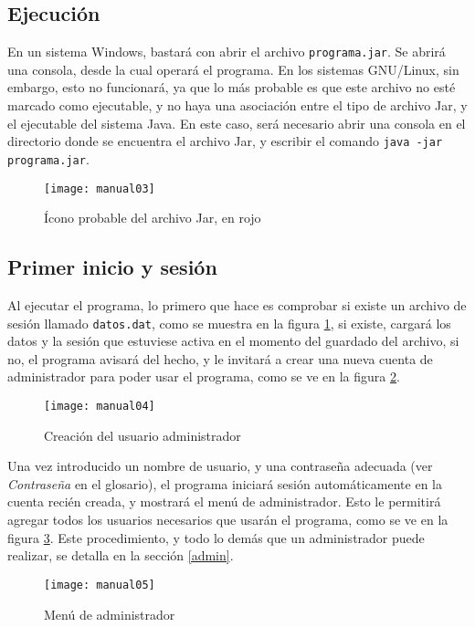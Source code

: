 \documentclass[titlepage,letterpaper,12pt]{article}
\begin{document}
\subsection{Ejecución}
En un sistema Windows, bastará con abrir el archivo \texttt{programa.jar}. Se abrirá una consola, desde la cual operará el programa. En los sistemas GNU/Linux, sin embargo, esto no funcionará, ya que lo más probable es que este archivo no esté marcado como ejecutable, y no haya una asociación entre el tipo de archivo Jar, y el ejecutable del sistema Java. En este caso, será necesario abrir una consola en el directorio donde se encuentra el archivo Jar, y escribir el comando \texttt{java -jar programa.jar}.
\begin{figure}
  \centering
  \texttt{[image: manual03]}
  \caption{Ícono probable del archivo Jar, en rojo}
  \label{fig:m3}
\end{figure}

\subsection{Primer inicio y sesión}
Al ejecutar el programa, lo primero que hace es comprobar si existe un archivo de sesión llamado \texttt{datos.dat}, como se muestra en la figura \ref{fig:m3}, si existe, cargará los datos y la sesión que estuviese activa en el momento del guardado del archivo, si no, el programa avisará del hecho, y le invitará a crear una nueva cuenta de administrador para poder usar el programa, como se ve en la figura \ref{fig:m4}.

\begin{figure}
  \centering
  \texttt{[image: manual04]}
  \caption{Creación del usuario administrador}
  \vspace{-1.5cm}
  \label{fig:m4}
\end{figure}

Una vez introducido un nombre de usuario, y una contraseña adecuada (ver \emph{Contraseña} en el glosario), el programa iniciará sesión automáticamente en la cuenta recién creada, y mostrará el menú de administrador. Esto le permitirá agregar todos los usuarios necesarios que usarán el programa, como se ve en la figura \ref{fig:m5}. Este procedimiento, y todo lo demás que un administrador puede realizar, se detalla en la sección \ref{admin}.
\begin{figure}
  \centering
  \texttt{[image: manual05]}
  \vspace{-1.5cm}
  \caption{Menú de administrador}
  \label{fig:m5}
\end{figure}
\end{document}
